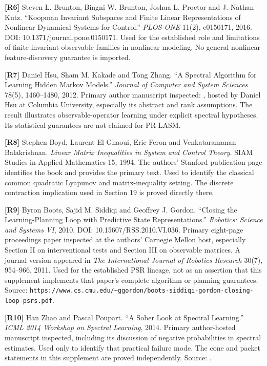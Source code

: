 \documentclass[11pt,oneside,openany]{book}
\numberwithin{equation}{section}
\begin{document}
\textbf{{[}R6{]}} Steven L. Brunton, Bingni W. Brunton, Joshua L.
Proctor and J. Nathan Kutz. ``Koopman Invariant Subspaces and Finite
Linear Representations of Nonlinear Dynamical Systems for Control.''
\emph{PLOS ONE} 11(2), e0150171, 2016. DOI:
10.1371/journal.pone.0150171. Used for the established role and
limitations of finite invariant observable families in nonlinear
modeling. No general nonlinear feature-discovery guarantee is imported.

\textbf{{[}R7{]}} Daniel Hsu, Sham M. Kakade and Tong Zhang. ``A
Spectral Algorithm for Learning Hidden Markov Models.'' \emph{Journal of
Computer and System Sciences} 78(5), 1460--1480, 2012. Primary author
manuscript inspected: , hosted by Daniel Hsu at
Columbia University, especially its abstract and rank assumptions. The
result illustrates observable-operator learning under explicit spectral
hypotheses. Its statistical guarantees are not claimed for PR-LASM.

\textbf{{[}R8{]}} Stephen Boyd, Laurent El Ghaoui, Eric Feron and
Venkataramanan Balakrishnan. \emph{Linear Matrix Inequalities in System
and Control Theory}. SIAM Studies in Applied Mathematics 15, 1994. The
authors' Stanford publication page identifies the book and provides the
primary text. Used to identify the classical common quadratic Lyapunov
and matrix-inequality setting. The discrete contraction implication used
in Section 19 is proved directly there.

\textbf{{[}R9{]}} Byron Boots, Sajid M. Siddiqi and Geoffrey J. Gordon.
``Closing the Learning-Planning Loop with Predictive State
Representations.'' \emph{Robotics: Science and Systems VI}, 2010. DOI:
10.15607/RSS.2010.VI.036. Primary eight-page proceedings paper inspected
at the authors' Carnegie Mellon host, especially Section II on
interventional tests and Section III on observable matrices. A journal
version appeared in \emph{The International Journal of Robotics
Research} 30(7), 954--966, 2011. Used for the established PSR lineage,
not as an assertion that this supplement implements that paper's
complete algorithm or planning guarantees. Source:
\texttt{https://www.cs.cmu.edu/\textasciitilde{}ggordon/boots-siddiqi-gordon-closing-loop-psrs.pdf}.

\textbf{{[}R10{]}} Han Zhao and Pascal Poupart. ``A Sober Look at
Spectral Learning.'' \emph{ICML 2014 Workshop on Spectral Learning},
2014. Primary author-hosted manuscript inspected, including its
discussion of negative probabilities in spectral estimates. Used only to
identify that practical failure mode. The cone and packet statements in
this supplement are proved independently. Source:
.
\end{document}
